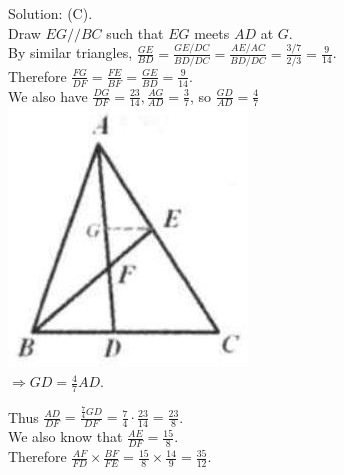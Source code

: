 \documentclass{article}
\begin{document}
Solution: (C).\\
Draw \(E G / / B C\) such that \(E G\) meets \(A D\) at \(G\).\\
By similar triangles, \(\frac{G E}{B D}=\frac{G E / D C}{B D / D C}=\frac{A E / A C}{B D / D C}=\frac{3 / 7}{2 / 3}=\frac{9}{14}\).\\
Therefore \(\frac{F G}{D F}=\frac{F E}{B F}=\frac{G E}{B D}=\frac{9}{14}\).\\
We also have \(\frac{D G}{D F}=\frac{23}{14}, \frac{A G}{A D}=\frac{3}{7}\), so \(\frac{G D}{A D}=\frac{4}{7}\)\\
\centering
\includegraphics[width=\textwidth]{images/106(1).jpg}\\
\(\Rightarrow G D=\frac{4}{7} A D\).


Thus \(\frac{A D}{D F}=\frac{\frac{7}{4} G D}{D F}=\frac{7}{4} \cdot \frac{23}{14}=\frac{23}{8}\).\\
We also know that \(\frac{A E}{D F}=\frac{15}{8}\).\\
Therefore \(\frac{A F}{F D} \times \frac{B F}{F E}=\frac{15}{8} \times \frac{14}{9}=\frac{35}{12}\).\\
\end{document}
